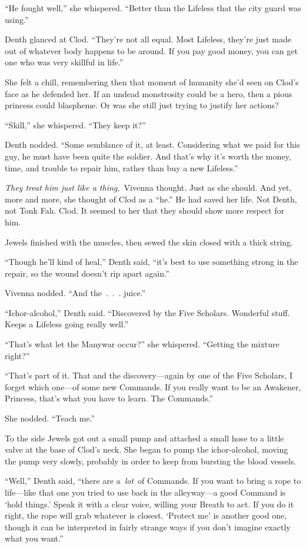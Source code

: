 “He fought well,” she whispered. “Better than the Lifeless that the city guard was using.”

Denth glanced at Clod. “They’re not all equal. Most Lifeless, they’re just made out of whatever body happens to be around. If you pay good money, you can get one who was very skillful in life.”

She felt a chill, remembering then that moment of humanity she’d seen on Clod’s face as he defended her. If an undead monstrosity could be a hero, then a pious princess could blaspheme. Or was she still just trying to justify her actions?

“Skill,” she whispered. “They keep it?”

Denth nodded. “Some semblance of it, at least. Considering what we paid for this guy, he must have been quite the soldier. And that’s why it’s worth the money, time, and trouble to repair him, rather than buy a new Lifeless.”

\textit{They treat him just like a thing,}~Vivenna thought. Just as she should. And yet, more and more, she thought of Clod as a “he.” He had saved her life. Not Denth, not Tonk Fah. Clod. It seemed to her that they should show more respect for him.

Jewels finished with the muscles, then sewed the skin closed with a thick string.

“Though he’ll kind of heal,” Denth said, “it’s best to use something strong in the repair, so the wound doesn’t rip apart again.”

Vivenna nodded. “And the~.~.~. juice.”

“Ichor-alcohol,” Denth said. “Discovered by the Five Scholars. Wonderful stuff. Keeps a Lifeless going really well.”

“That’s what let the Manywar occur?” she whispered. “Getting the mixture right?”

“That’s part of it. That and the discovery—again by one of the Five Scholars, I forget which one—of some new Commands. If you really want to be an Awakener, Princess, that’s what you have to learn. The Commands.”

She nodded. “Teach me.”

To the side Jewels got out a small pump and attached a small hose to a little valve at the base of Clod’s neck. She began to pump the ichor-alcohol, moving the pump very slowly, probably in order to keep from bursting the blood vessels.

“Well,” Denth said, “there are a~\textit{lot}~of Commands. If you want to bring a rope to life—like that one you tried to use back in the alleyway—a good Command is ‘hold things.’ Speak it with a clear voice, willing your Breath to act. If you do it right, the rope will grab whatever is closest. ‘Protect me’ is another good one, though it can be interpreted in fairly strange ways if you don’t imagine exactly what you want.”

